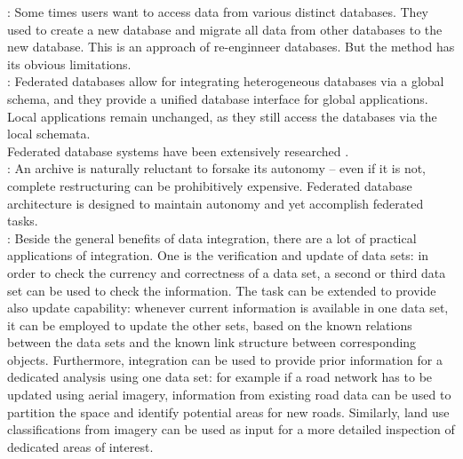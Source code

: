 \documentclass[12pt,a4paper]{report}
\begin{document}
	\citep{Jian}: Some times users want to access data from various distinct databases. They used to create a new database and migrate all data from other databases to the new database. This is an approach of re-enginneer databases. But the method has its obvious limitations.
	\\

	\citep{Butenuth}: Federated databases allow for integrating heterogeneous databases via a global schema, and they provide a unified database interface for global applications. Local applications remain unchanged, as they still access the databases via the local schemata.
	\\

	Federated database systems have been extensively researched \citep{Litwin, Sheth}.
	\\

	\citep{Malik}: An archive is naturally reluctant to forsake its autonomy – even if it is not, complete restructuring can be prohibitively expensive. Federated database architecture is designed to maintain autonomy and yet accomplish federated tasks.
	\\

	\citep{Butenuth}: Beside the general benefits of data integration, there are a lot of practical applications of integration. One is the verification and update of data sets: in order to check the currency and correctness of a data set, a second or third data set can be used to check the information. The task can be extended to provide also update capability: whenever current information is available in one data set, it can be employed to update the other sets, based on the known relations between the data sets and the known link structure between corresponding objects. Furthermore, integration can be used to provide prior information for a dedicated analysis using one data set: for example if a road network has to be updated using aerial imagery, information from existing road data can be used to partition the space and identify potential areas for new roads. Similarly, land use classifications from imagery can be used as input for a more detailed inspection of dedicated areas of interest. 
	\\



	\renewcommand{\bibname}{References}
	
	
\end{document}
